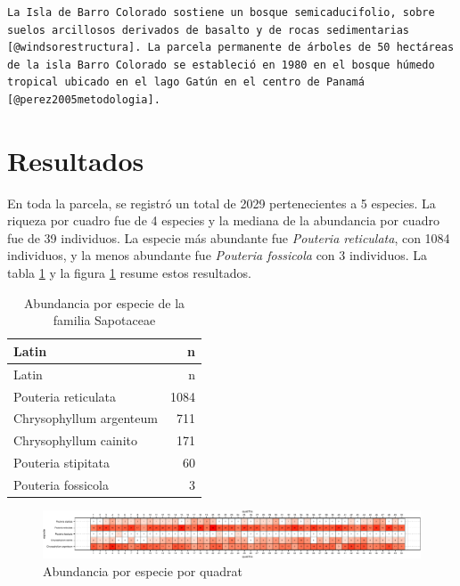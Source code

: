 \documentclass[11pt,]{article}
\begin{document}
\begin{verbatim}
La Isla de Barro Colorado sostiene un bosque semicaducifolio, sobre suelos arcillosos derivados de basalto y de rocas sedimentarias [@windsorestructura]. La parcela permanente de árboles de 50 hectáreas de la isla Barro Colorado se estableció en 1980 en el bosque húmedo tropical ubicado en el lago Gatún en el centro de Panamá [@perez2005metodologia].
\end{verbatim}

\section{Resultados}\label{resultados}

En toda la parcela, se registró un total de 2029 pertenecientes a 5
especies. La riqueza por cuadro fue de 4 especies y la mediana de la
abundancia por cuadro fue de 39 individuos. La especie más abundante fue
\emph{Pouteria reticulata}, con 1084 individuos, y la menos abundante
fue \emph{Pouteria fossicola} con 3 individuos. La tabla
\ref{tab:abun_sp} y la figura \ref{fig:abun_sp_q} resume estos
resultados.

\begin{longtable}[]{@{}lr@{}}
\caption{\label{tab:abun_sp}Abundancia por especie de la familia
Sapotaceae}\tabularnewline
\toprule
Latin & n\tabularnewline
\midrule
\endfirsthead
\toprule
Latin & n\tabularnewline
\midrule
\endhead
Pouteria reticulata & 1084\tabularnewline
Chrysophyllum argenteum & 711\tabularnewline
Chrysophyllum cainito & 171\tabularnewline
Pouteria stipitata & 60\tabularnewline
Pouteria fossicola & 3\tabularnewline
\bottomrule
\end{longtable}

\begin{figure}
\centering
\includegraphics{manuscrito_files/figure-latex/unnamed-chunk-3-1.pdf}
\caption{\label{fig:abun_sp_q}Abundancia por especie por quadrat}
\end{figure}
\end{document}
